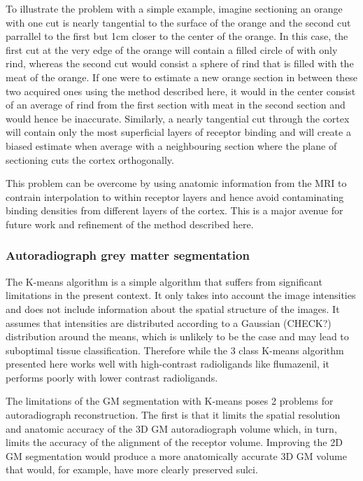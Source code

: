 \documentclass[12pt]{article}
\begin{document}
To illustrate the problem with a simple example, imagine sectioning an orange with one cut is nearly tangential to the surface of the orange and the second cut parrallel to the first but 1cm closer to the center of the orange. In this case, the first cut at the very edge of the orange will contain  a filled circle of with only rind, whereas the second cut would consist a sphere of rind that is filled with the meat of the orange. If one were to estimate a new orange section in between these two acquired ones using the method described here, it would in the center consist of an average of rind from the first section with meat in the second section and would hence be inaccurate. Similarly, a nearly tangential cut through the cortex will contain only the most superficial layers of receptor binding and will create a biased estimate when average with a neighbouring section where the plane of sectioning cuts the cortex orthogonally.  

This problem can be overcome by using anatomic information from the MRI to contrain interpolation to within receptor layers and hence avoid contaminating binding densities from different layers of the cortex. This is a major avenue for future work and refinement of the method described here. 

\subsubsection{Autoradiograph grey matter segmentation}
The K-means algorithm is a simple algorithm that suffers from significant limitations in the present context. It only takes into account the image intensities and does not include information about the spatial structure of the images. It assumes that intensities are distributed according to a Gaussian (CHECK?) distribution around the means, which is unlikely to be the case and may lead to suboptimal tissue classification. Therefore while the 3 class K-means algorithm presented here works well with high-contrast radioligands like flumazenil, it performs poorly with lower contrast radioligands.

The limitations of the GM segmentation with K-means poses 2 problems for autoradiograph reconstruction. The first is that it limits the spatial resolution and anatomic accuracy of the 3D GM autoradiograph volume which, in turn, limits the accuracy of the alignment of the receptor volume. Improving the 2D GM segmentation would produce a more anatomically accurate 3D GM volume that would, for example, have more clearly preserved sulci. 
\end{document}
